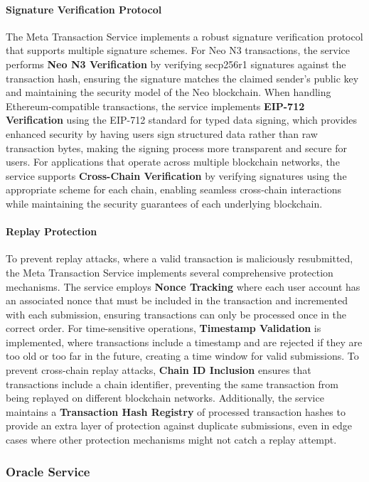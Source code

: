 \documentclass[11pt]{article}
\begin{document}
\paragraph{Signature Verification Protocol}
The Meta Transaction Service implements a robust signature verification protocol that supports multiple signature schemes. For Neo N3 transactions, the service performs \textbf{Neo N3 Verification} by verifying secp256r1 signatures against the transaction hash, ensuring the signature matches the claimed sender's public key and maintaining the security model of the Neo blockchain. When handling Ethereum-compatible transactions, the service implements \textbf{EIP-712 Verification} using the EIP-712 standard for typed data signing, which provides enhanced security by having users sign structured data rather than raw transaction bytes, making the signing process more transparent and secure for users. For applications that operate across multiple blockchain networks, the service supports \textbf{Cross-Chain Verification} by verifying signatures using the appropriate scheme for each chain, enabling seamless cross-chain interactions while maintaining the security guarantees of each underlying blockchain.

\paragraph{Replay Protection}
To prevent replay attacks, where a valid transaction is maliciously resubmitted, the Meta Transaction Service implements several comprehensive protection mechanisms. The service employs \textbf{Nonce Tracking} where each user account has an associated nonce that must be included in the transaction and incremented with each submission, ensuring transactions can only be processed once in the correct order. For time-sensitive operations, \textbf{Timestamp Validation} is implemented, where transactions include a timestamp and are rejected if they are too old or too far in the future, creating a time window for valid submissions. To prevent cross-chain replay attacks, \textbf{Chain ID Inclusion} ensures that transactions include a chain identifier, preventing the same transaction from being replayed on different blockchain networks. Additionally, the service maintains a \textbf{Transaction Hash Registry} of processed transaction hashes to provide an extra layer of protection against duplicate submissions, even in edge cases where other protection mechanisms might not catch a replay attempt.

\subsubsection{Oracle Service}
\label{subsubsec:oracle}
\end{document}
